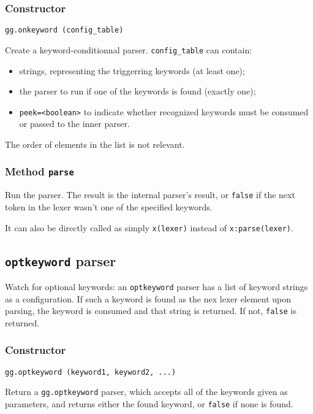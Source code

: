 \subsubsection{Constructor}

\begin{verbatim}
gg.onkeyword (config_table)
\end{verbatim}

Create a keyword-conditionnal parser. \verb|config_table| can contain:

\begin{itemize}
\item strings, representing the triggerring keywords (at least one);
\item the parser to run if one of the keywords is found (exactly one);
\item \verb|peek=<boolean>| to indicate whether recognized keywords
  must be consumed or passed to the inner parser.
\end{itemize}
The order of elements in the list is not relevant.

\subsubsection{Method {\tt parse}}

Run the parser. The result is the internal parser's result, or
\verb|false| if the next token in the lexer wasn't one of the
specified keywords.

It can also be directly called as simply \verb|x(lexer)| instead of
\verb|x:parse(lexer)|.

\subsection{{\tt optkeyword} parser}

Watch for optional keywords: an \verb|optkeyword| parser has a list of
keyword strings as a configuration. If such a keyword is found as the
nex lexer element upon parsing, the keyword is consumed and that
string is returned. If not, \verb|false| is returned.

\subsubsection{Constructor}

\begin{verbatim}
gg.optkeyword (keyword1, keyword2, ...)
\end{verbatim}

Return a \verb|gg.optkeyword| parser, which accepts all of the
keywords given as parameters, and returns either the found keyword, or
\verb|false| if none is found.
